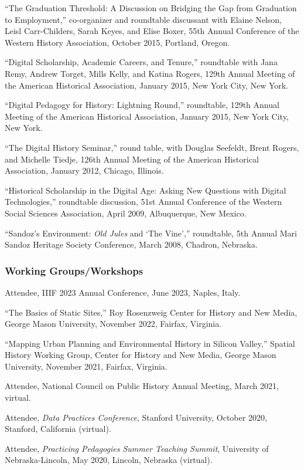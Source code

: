 ``The Graduation Threshold: A Discussion on Bridging the Gap from
Graduation to Employment,'' co-organizer and roundtable discussant with
Elaine Nelson, Leisl Carr-Childers, Sarah Keyes, and Elise Boxer, 55th
Annual Conference of the Western History Association, October 2015,
Portland, Oregon.

``Digital Scholarship, Academic Careers, and Tenure,'' roundtable with
Jana Remy, Andrew Torget, Mills Kelly, and Katina Rogers, 129th Annual
Meeting of the American Historical Association, January 2015, New York
City, New York.

``Digital Pedagogy for History: Lightning Round,'' roundtable, 129th
Annual Meeting of the American Historical Association, January 2015, New
York City, New York.

``The Digital History Seminar,'' round table, with Douglas Seefeldt,
Brent Rogers, and Michelle Tiedje, 126th Annual Meeting of the American
Historical Association, January 2012, Chicago, Illinois.

``Historical Scholarship in the Digital Age: Asking New Questions with
Digital Technologies,'' roundtable discussion, 51st Annual Conference of
the Western Social Sciences Association, April 2009, Albuquerque, New
Mexico.

``Sandoz's Environment: \emph{Old Jules} and `The Vine','' roundtable,
5th Annual Mari Sandoz Heritage Society Conference, March 2008, Chadron,
Nebraska.

\subsubsection{Working Groups/Workshops}\label{working-groupsworkshops}

Attendee, IIIF 2023 Annual Conference, June 2023, Naples, Italy.

``The Basics of Static Sites,'' Roy Rosenzweig Center for History and
New Media, George Mason University, November 2022, Fairfax, Virginia.

``Mapping Urban Planning and Environmental History in Silicon Valley,''
Spatial History Working Group, Center for History and New Media, George
Mason University, November 2021, Fairfax, Virginia.

Attendee, National Council on Public History Annual Meeting, March 2021,
virtual.

Attendee, \emph{Data Practices Conference}, Stanford University, October
2020, Stanford, California (virtual).

Attendee, \emph{Practicing Pedagogies Summer Teaching Summit},
University of Nebraska-Lincoln, May 2020, Lincoln, Nebraska (virtual).

